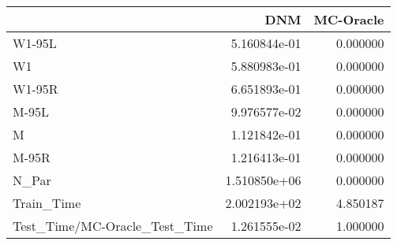 \begin{tabular}{lrr}
\toprule
{} &           DNM &  MC-Oracle \\
\midrule
W1-95L                        &  5.160844e-01 &   0.000000 \\
W1                            &  5.880983e-01 &   0.000000 \\
W1-95R                        &  6.651893e-01 &   0.000000 \\
M-95L                         &  9.976577e-02 &   0.000000 \\
M                             &  1.121842e-01 &   0.000000 \\
M-95R                         &  1.216413e-01 &   0.000000 \\
N\_Par                         &  1.510850e+06 &   0.000000 \\
Train\_Time                    &  2.002193e+02 &   4.850187 \\
Test\_Time/MC-Oracle\_Test\_Time &  1.261555e-02 &   1.000000 \\
\bottomrule
\end{tabular}
